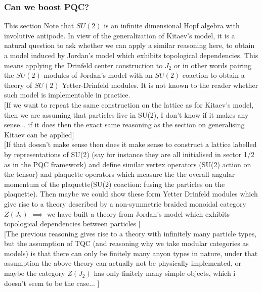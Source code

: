 \documentclass{article}
\begin{document}
\subsubsection{Can we boost PQC?}
This section 
Note that $SU(2)$ is an infinite dimensional Hopf algebra with involutive antipode. In view of the generalization of Kitaev's model, it is a natural question to ask whether we can apply a similar reasoning here, to obtain a model induced by Jordan's model which exhibits topological dependencies. This means applying the Drinfeld center construction to $J_2$ or in other words pairing the $SU(2)$-modules of Jordan's model with an $SU(2)$ coaction to obtain a theory of $SU(2)$ Yetter-Drinfeld modules. It is not known to the reader whether such model is implementable in practice. \\
{\color{blue} [If we want to repeat the same construction on the lattice as for Kitaev's model, then we are assuming that particles live in SU(2), I don't know if it makes any sense... if it does then the exact same reasoning as the section on generalising Kitaev can be applied]}\\
{\color{blue} [If that doesn't make sense then does it make sense to construct a lattice labelled by representations of SU(2) (say for instance they are all initialised in sector 1/2 as in the PQC framework) and define similar vertex operators (SU(2) action on the tensor) and plaquette operators which measure the the overall angular momentum of the plaquette(SU(2) coaction: fusing the particles on the plaquette). Then maybe we could show these form Yetter Drinfeld modules which give rise to a theory described by a non-symmetric braided monoidal category $Z(J_2)$ $\implies$ we have built a theory from Jordan's model which exhibits topological dependencies between particles ]}\\
{\color{blue} [The previous reasoning gives rise to a theory with infinitely many particle types, but the assumption of TQC (and reasoning why we take modular categories as models) is that there can only be finitely many anyon types in nature, under that assumption the above theory can actually not be physically implemented, or maybe the category $Z(J_2)$ has only finitely many simple objects, which i doesn't seem to be the case... ]}
\end{document}
